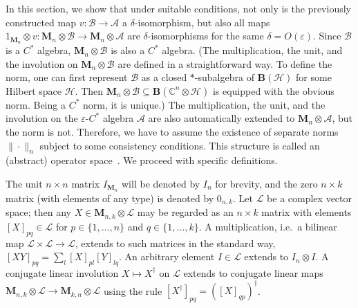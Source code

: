 \documentclass[12pt]{article}
\newcommand{\CC}{\mathbb{C}}
\newcommand{\calA}{\mathcal{A}}
\newcommand{\calB}{\mathcal{B}}
\newcommand{\calH}{\mathcal{H}}
\newcommand{\calL}{\mathcal{L}}
\newcommand{\Bo}{\mathbf{B}}
\newcommand*{\Ma}[1]{\mathbf{M}_{#1}}
\newcommand{\eps}{\varepsilon}
\newtheorem[definition]{Definition}[Theorem]{Definition}
\newtheorem[remark]{Example}[Theorem]{Example}
\newtheorem[remark]{Remark}[Theorem]{Remark}
\newtheorem[remark]{Question}[Theorem]{Open question}
\newtheorem*[definition]{definition}{Definition}
\newtheorem*[remark]{example}{Example}
\newtheorem*[remark]{remark}{Remark}
\newtheorem*[remark]{question}{Open question}
\numberwithin{equation}{section}
\begin{document}
In this section, we show that under suitable conditions, not only is the previously constructed map $v\colon\calB\to\calA$ a $\delta$-isomorphism, but also all maps $1_{\Ma{n}}\otimes v\colon \Ma{n}\otimes\calB\to\Ma{n}\otimes\calA$ are  $\delta$-isomorphisms for the same $\delta=O(\eps)$. Since $\calB$ is a $C^*$ algebra, $\Ma{n}\otimes\calB$ is also a $C^*$ algebra. (The multiplication, the unit, and the involution on $\Ma{n}\otimes\calB$ are defined in a straightforward way. To define the norm, one can first represent $\calB$ as a closed $*$-subalgebra of $\Bo(\calH)$ for some Hilbert space $\calH$. Then $\Ma{n}\otimes\calB\subseteq\Bo(\CC^n\otimes\calH)$ is equipped with the obvious norm. Being a $C^*$ norm, it is unique.) The multiplication, the unit, and the involution on the $\eps$-$C^*$ algebra $\calA$ are also automatically extended to $\Ma{n}\otimes\calA$, but the norm is not. Therefore, we have to assume the existence of separate norms $\|\cdot\|_n$ subject to some consistency conditions. This structure is called an (abstract) operator space~\cite[Chapter 13]{Paulsen}. We proceed with specific definitions.\smallskip

The unit $n\times n$ matrix $I_{\Ma{n}}$ will be denoted by $I_n$ for brevity, and the zero $n\times k$ matrix (with elements of any type) is denoted by $0_{n,k}$. Let $\calL$ be a complex vector space; then any $X\in\Ma{n,k}\otimes\calL$ may be regarded as an $n\times k$ matrix with elements $[X]_{pq}\in\calL$ for $p\in\{1,\dots,n\}$ and $q\in\{1,\dots,k\}$. A multiplication, i.e.\ a bilinear map $\calL\times\calL\to\calL$, extends to such matrices in the standard way, $[XY]_{pq}=\sum_l[X]_{pl}[Y]_{lq}$. An arbitrary element $I\in\calL$ extends to $I_n\otimes I$. A conjugate linear involution $X\mapsto X^\dag$ on $\calL$ extends to conjugate linear maps $\Ma{n,k}\otimes\calL\to\Ma{k,n}\otimes\calL$ using the rule $[X^\dag]_{pq}=([X]_{qp})^\dag$. 
\end{document}
